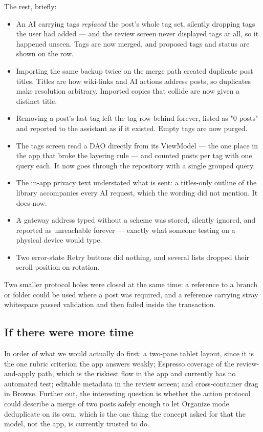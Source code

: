 The rest, briefly:

\begin{itemize}
  \item An AI  carrying tags \emph{replaced} the post's whole tag set, silently
        dropping tags the user had added --- and the review screen never displayed tags at all, so it
        happened unseen. Tags are now merged, and proposed tags and status are shown on the row.
  \item Importing the same backup twice on the merge path created duplicate post titles. Titles are
        how wiki-links and AI actions address posts, so duplicates make resolution arbitrary. Imported
        copies that collide are now given a distinct title.
  \item Removing a post's last tag left the tag row behind forever, listed as "0 posts" and reported
        to the assistant as if it existed. Empty tags are now purged.
  \item The tags screen read a DAO directly from its ViewModel --- the one place in the app that broke
        the layering rule --- and counted posts per tag with one query each. It now goes through the
        repository with a single grouped query.
  \item The in-app privacy text understated what is sent: a titles-only outline of the library
        accompanies every AI request, which the wording did not mention. It does now.
  \item A gateway address typed without a scheme was stored, silently ignored, and reported as
        unreachable forever --- exactly what someone testing on a physical device would type.
  \item Two error-state Retry buttons did nothing, and several lists dropped their scroll position on
        rotation.
\end{itemize}

Two smaller protocol holes were closed at the same time: a reference to a branch or folder could be
used where a post was required, and a reference carrying stray whitespace passed validation and then
failed inside the transaction.

\subsection{If there were more time}

In order of what we would actually do first: a two-pane tablet layout, since it is the one rubric
criterion the app answers weakly; Espresso coverage of the review-and-apply path, which is the
riskiest flow in the app and currently has no automated test; editable metadata in the review screen;
and cross-container drag in Browse. Further out, the interesting question is whether the action
protocol could describe a merge of two posts safely enough to let Organize mode deduplicate on its
own, which is the one thing the concept asked for that the model, not the app, is currently trusted to
do.
